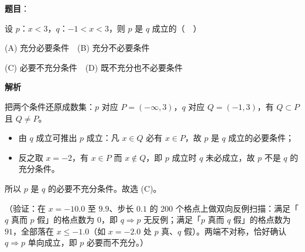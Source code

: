 \begin{answer}

\textbf{题目}：

设 \(p\)：\(x<3\)，\(q\)：\(-1<x<3\)，则 \(p\) 是 \(q\) 成立的（　）

(A) 充分必要条件　(B) 充分不必要条件

(C) 必要不充分条件　(D) 既不充分也不必要条件

\textbf{解析}

把两个条件还原成数集：\(p\) 对应 \(P=(-\infty,3)\)，\(q\) 对应 \(Q=(-1,3)\)，有 \(Q\subset P\) 且 \(Q\neq P\)。

\begin{itemize}
\item 由 \(q\) 成立可推出 \(p\) 成立：凡 \(x\in Q\) 必有 \(x\in P\)，故 \(p\) 是 \(q\) 成立的必要条件；
\item 反之取 \(x=-2\)，有 \(x\in P\) 而 \(x\notin Q\)，即 \(p\) 成立时 \(q\) 未必成立，故 \(p\) 不是 \(q\) 的充分条件。
\end{itemize}

所以 \(p\) 是 \(q\) 的必要不充分条件。故选 (C)。

（验证：在 \(x=-10.0\) 至 \(9.9\)、步长 \(0.1\) 的 200 个格点上做双向反例扫描：满足「\(q\) 真而 \(p\) 假」的格点数为 \(0\)，即 \(q\Rightarrow p\) 无反例；满足「\(p\) 真而 \(q\) 假」的格点数为 \(91\)，全部落在 \(x\leqslant -1.0\)（如 \(x=-2.0\) 处 \(p\) 真、\(q\) 假）。两端不对称，恰好确认 \(q\Rightarrow p\) 单向成立，即 \(p\) 必要而不充分。）


\end{answer}
